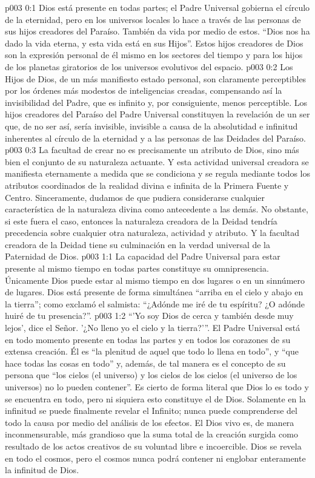 \author{Consejero divino}
\vs p003 0:1 Dios está presente en todas partes; el Padre Universal gobierna el círculo de la eternidad, pero en los universos locales lo hace a través de las personas de sus hijos creadores del Paraíso. También da vida por medio de estos. “Dios nos ha dado la vida eterna, y esta vida está en sus Hijos”. Estos hijos creadores de Dios son la expresión personal de él mismo en los sectores del tiempo y para los hijos de los planetas giratorios de los universos evolutivos del espacio.
\vs p003 0:2 Los Hijos de Dios, de un más manifiesto estado personal, son claramente perceptibles por los órdenes más modestos de inteligencias creadas, compensando así la invisibilidad del Padre, que es infinito y, por consiguiente, menos perceptible. Los hijos creadores del Paraíso del Padre Universal constituyen la revelación de un ser que, de no ser así, sería invisible, invisible a causa de la absolutidad e infinitud inherentes al círculo de la eternidad y a las personas de las Deidades del Paraíso.
\vs p003 0:3 \pc La facultad de crear no es precisamente un atributo de Dios, sino más bien el conjunto de su naturaleza actuante. Y esta actividad universal creadora se manifiesta eternamente a medida que se condiciona y se regula mediante todos los atributos coordinados de la realidad divina e infinita de la Primera Fuente y Centro. Sinceramente, dudamos de que pudiera considerarse cualquier característica de la naturaleza divina como antecedente a las demás. No obstante, si este fuera el caso, entonces la naturaleza creadora de la Deidad tendría precedencia sobre cualquier otra naturaleza, actividad y atributo. Y la facultad creadora de la Deidad tiene su culminación en la verdad universal de la Paternidad de Dios.
\vs p003 1:1 La capacidad del Padre Universal para estar presente al mismo tiempo en todas partes constituye su omnipresencia. Únicamente Dios puede estar al mismo tiempo en dos lugares o en un sinnúmero de lugares. Dios está presente de forma simultánea “arriba en el cielo y abajo en la tierra”; como exclamó el salmista: “¿Adónde me iré de tu espíritu? ¿O adónde huiré de tu presencia?”.
\vs p003 1:2 “'Yo soy Dios de cerca y también desde muy lejos', dice el Señor. '¿No lleno yo el cielo y la tierra?'”. El Padre Universal está en todo momento presente en todas las partes y en todos los corazones de su extensa creación. Él es “la plenitud de aquel que todo lo llena en todo”, y “que hace todas las cosas en todo” y, además, de tal manera es el concepto de su persona que “los cielos (el universo) y los cielos de los cielos (el universo de los universos) no lo pueden contener”. Es cierto de forma literal que Dios lo es todo y se encuentra en todo, pero ni siquiera esto constituye el  de Dios. Solamente en la infinitud se puede finalmente revelar el Infinito; nunca puede comprenderse del todo la causa por medio del análisis de los efectos. El Dios vivo es, de manera inconmensurable, más grandioso que la suma total de la creación surgida como resultado de los actos creativos de su voluntad libre e incoercible. Dios se revela en todo el cosmos, pero el cosmos nunca podrá contener ni englobar enteramente la infinitud de Dios.

